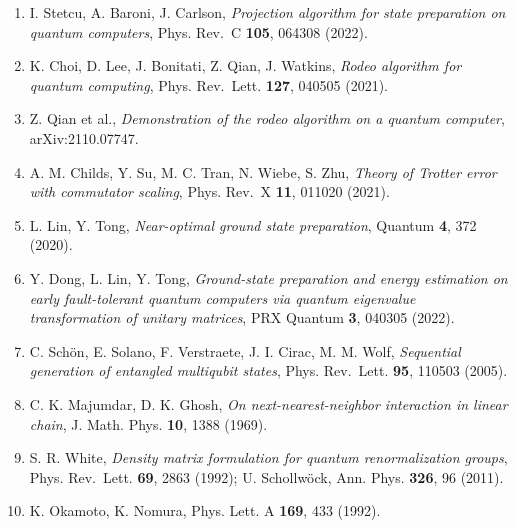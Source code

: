 \documentclass[
]{article}
\providecommand{\tightlist}{%
  \setlength{\itemsep}{0pt}\setlength{\parskip}{0pt}}
\begin{document}
\begin{enumerate}
\def\labelenumi{\arabic{enumi}.}
\tightlist
\item
  I. Stetcu, A. Baroni, J. Carlson, \emph{Projection algorithm for state
  preparation on quantum computers}, Phys. Rev.~C \textbf{105}, 064308
  (2022).
\item
  K. Choi, D. Lee, J. Bonitati, Z. Qian, J. Watkins, \emph{Rodeo
  algorithm for quantum computing}, Phys. Rev.~Lett. \textbf{127},
  040505 (2021).
\item
  Z. Qian et al., \emph{Demonstration of the rodeo algorithm on a
  quantum computer}, arXiv:2110.07747.
\item
  A. M. Childs, Y. Su, M. C. Tran, N. Wiebe, S. Zhu, \emph{Theory of
  Trotter error with commutator scaling}, Phys. Rev.~X \textbf{11},
  011020 (2021).
\item
  L. Lin, Y. Tong, \emph{Near-optimal ground state preparation}, Quantum
  \textbf{4}, 372 (2020).
\item
  Y. Dong, L. Lin, Y. Tong, \emph{Ground-state preparation and energy
  estimation on early fault-tolerant quantum computers via quantum
  eigenvalue transformation of unitary matrices}, PRX Quantum
  \textbf{3}, 040305 (2022).
\item
  C. Schön, E. Solano, F. Verstraete, J. I. Cirac, M. M. Wolf,
  \emph{Sequential generation of entangled multiqubit states}, Phys.
  Rev.~Lett. \textbf{95}, 110503 (2005).
\item
  C. K. Majumdar, D. K. Ghosh, \emph{On next-nearest-neighbor
  interaction in linear chain}, J. Math. Phys. \textbf{10}, 1388 (1969).
\item
  S. R. White, \emph{Density matrix formulation for quantum
  renormalization groups}, Phys. Rev.~Lett. \textbf{69}, 2863 (1992); U.
  Schollwöck, Ann. Phys. \textbf{326}, 96 (2011).
\item
  K. Okamoto, K. Nomura, Phys. Lett. A \textbf{169}, 433 (1992).
\end{enumerate}
\end{document}
